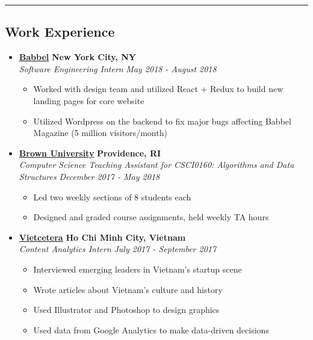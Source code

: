 \documentclass[10pt,letterpaper]{article}
\begin{document}
\hrule
\vspace{-1.0em}
\subsection*{Work Experience}
  \begin{itemize}
    \parskip=-0.5em

    \item[]
    {\href{https://www.babbel.com/}{\textbf{Babbel}} \hfill
      \textbf{New York City, NY}}
    \\
    {\emph{Software Engineering Intern} \hfill \emph{May 2018 - August 2018}}

    \begin{itemize}[label=\textbullet]
      \itemsep0em
      \item Worked with design team and utilized React + Redux to build new landing pages for core website
      \item Utilized Wordpress on the backend to fix major bugs affecting Babbel Magazine (5 million visitors/month)
    \end{itemize}


    \item[]
    {\href{https://www.brown.edu/}{\textbf{Brown University}} \hfill
      \textbf{Providence, RI}}
    \\
    {\emph{Computer Science Teaching Assistant for CSCI0160: Algorithms and Data Structures} \hfill \emph{December 2017 - May 2018}}

    \begin{itemize}[label=\textbullet]
      \itemsep0em
      \item Led two weekly sections of 8 students each
      \item Designed and graded course assignments, held weekly TA hours
    \end{itemize}

    \item[]
    {\href{http://vietcetera.com/}{\textbf{Vietcetera}} \hfill
      \textbf{Ho Chi Minh City, Vietnam}}
    \\
    {\emph{Content Analytics Intern} \hfill \emph{July 2017 - September 2017}}

    \begin{itemize}[label=\textbullet]
      \itemsep0em
      \item Interviewed emerging leaders in Vietnam's startup scene
      \item Wrote articles about Vietnam's culture and history
      \item Used Illustrator and Photoshop to design graphics
      \item Used data from Google Analytics to make data-driven decisions
    \end{itemize}


\end{itemize}
\end{document}
